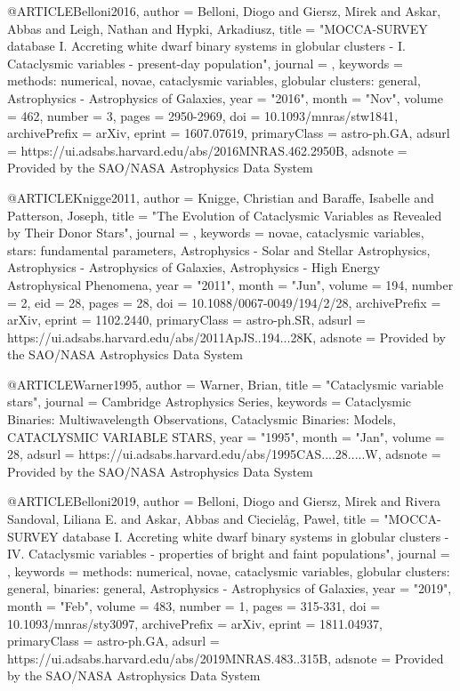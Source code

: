 \documentclass[twocolumn,tighten]{aastex63}
\begin{document}
@ARTICLE{Belloni2016,
       author = {{Belloni}, Diogo and {Giersz}, Mirek and {Askar}, Abbas and
         {Leigh}, Nathan and {Hypki}, Arkadiusz},
        title = "{MOCCA-SURVEY database I. Accreting white dwarf binary systems in globular clusters - I. Cataclysmic variables - present-day population}",
      journal = {\mnras},
     keywords = {methods: numerical, novae, cataclysmic variables, globular clusters: general, Astrophysics - Astrophysics of Galaxies},
         year = "2016",
        month = "Nov",
       volume = {462},
       number = {3},
        pages = {2950-2969},
          doi = {10.1093/mnras/stw1841},
archivePrefix = {arXiv},
       eprint = {1607.07619},
 primaryClass = {astro-ph.GA},
       adsurl = {https://ui.adsabs.harvard.edu/abs/2016MNRAS.462.2950B},
      adsnote = {Provided by the SAO/NASA Astrophysics Data System}
}

@ARTICLE{Knigge2011,
       author = {{Knigge}, Christian and {Baraffe}, Isabelle and {Patterson}, Joseph},
        title = "{The Evolution of Cataclysmic Variables as Revealed by Their Donor Stars}",
      journal = {\apjs},
     keywords = {novae, cataclysmic variables, stars: fundamental parameters, Astrophysics - Solar and Stellar Astrophysics, Astrophysics - Astrophysics of Galaxies, Astrophysics - High Energy Astrophysical Phenomena},
         year = "2011",
        month = "Jun",
       volume = {194},
       number = {2},
          eid = {28},
        pages = {28},
          doi = {10.1088/0067-0049/194/2/28},
archivePrefix = {arXiv},
       eprint = {1102.2440},
 primaryClass = {astro-ph.SR},
       adsurl = {https://ui.adsabs.harvard.edu/abs/2011ApJS..194...28K},
      adsnote = {Provided by the SAO/NASA Astrophysics Data System}
}

@ARTICLE{Warner1995,
       author = {{Warner}, Brian},
        title = "{Cataclysmic variable stars}",
      journal = {Cambridge Astrophysics Series},
     keywords = {Cataclysmic Binaries: Multiwavelength Observations, Cataclysmic Binaries: Models, CATACLYSMIC VARIABLE STARS},
         year = "1995",
        month = "Jan",
       volume = {28},
       adsurl = {https://ui.adsabs.harvard.edu/abs/1995CAS....28.....W},
      adsnote = {Provided by the SAO/NASA Astrophysics Data System}
}

@ARTICLE{Belloni2019,
       author = {{Belloni}, Diogo and {Giersz}, Mirek and {Rivera Sandoval}, Liliana E. and
         {Askar}, Abbas and {Cieciel{\r{a}}g}, Pawe{\l}},
        title = "{MOCCA-SURVEY database I. Accreting white dwarf binary systems in globular clusters - IV. Cataclysmic variables - properties of bright and faint populations}",
      journal = {\mnras},
     keywords = {methods: numerical, novae, cataclysmic variables, globular clusters: general, binaries: general, Astrophysics - Astrophysics of Galaxies},
         year = "2019",
        month = "Feb",
       volume = {483},
       number = {1},
        pages = {315-331},
          doi = {10.1093/mnras/sty3097},
archivePrefix = {arXiv},
       eprint = {1811.04937},
 primaryClass = {astro-ph.GA},
       adsurl = {https://ui.adsabs.harvard.edu/abs/2019MNRAS.483..315B},
      adsnote = {Provided by the SAO/NASA Astrophysics Data System}
}
\end{document}
